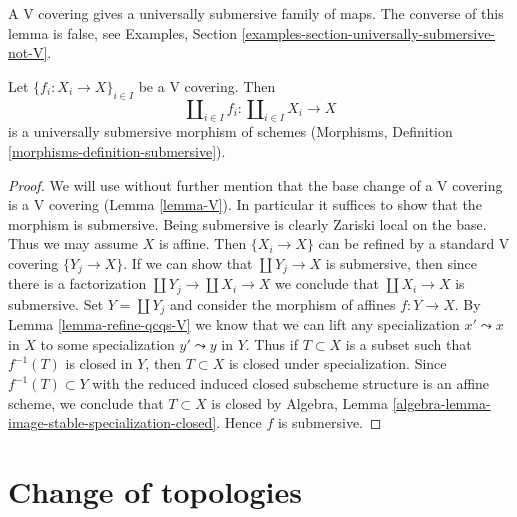 \noindent
A V covering gives a universally submersive family of maps.
The converse of this lemma is false, see
Examples, Section \ref{examples-section-universally-submersive-not-V}.

\begin{lemma}
\label{lemma-V-covering-universally-submersive}
Let $\{f_i : X_i \to X\}_{i \in I}$ be a V covering.
Then
$$
\coprod\nolimits_{i \in I} f_i :
\coprod\nolimits_{i \in I} X_i
\longrightarrow
X
$$
is a universally submersive morphism of schemes (Morphisms, Definition
\ref{morphisms-definition-submersive}).
\end{lemma}

\begin{proof}
We will use without further mention that the base change of a V covering
is a V covering (Lemma \ref{lemma-V}). In particular it suffices
to show that the morphism is submersive.
Being submersive is clearly Zariski local on the base.
Thus we may assume $X$ is affine. Then $\{X_i \to X\}$
can be refined by a standard V covering $\{Y_j \to X\}$.
If we can show that $\coprod Y_j \to X$ is submersive,
then since there is a factorization $\coprod Y_j \to \coprod X_i \to X$
we conclude that $\coprod X_i \to X$ is submersive.
Set $Y = \coprod Y_j$ and consider the morphism of affines
$f : Y \to X$.
By Lemma \ref{lemma-refine-qcqs-V} we know that we can lift any
specialization $x' \leadsto x$ in $X$ to some specialization
$y' \leadsto y$ in $Y$.
Thus if $T \subset X$ is a subset such that $f^{-1}(T)$
is closed in $Y$, then $T \subset X$ is closed under specialization.
Since $f^{-1}(T) \subset Y$
with the reduced induced closed subscheme structure
is an affine scheme, we conclude that $T \subset X$ is closed by
Algebra, Lemma \ref{algebra-lemma-image-stable-specialization-closed}.
Hence $f$ is submersive.
\end{proof}





















\section{Change of topologies}
\label{section-change-topologies}

